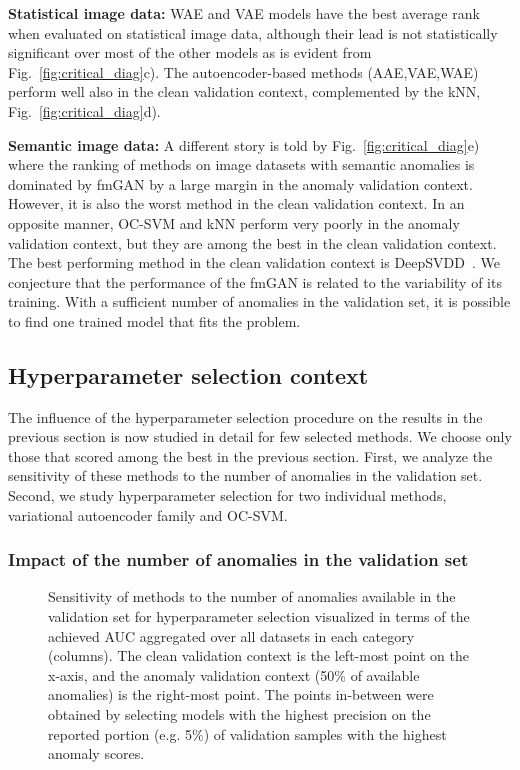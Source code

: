 \textbf{Statistical image data:} WAE and VAE models have the best average rank when evaluated on statistical image data, although their lead is not statistically significant over most of the other models as is evident from Fig.~\ref{fig:critical_diag}c). The autoencoder-based methods (AAE,VAE,WAE) perform well also in the clean validation context, complemented by the kNN, Fig.~\ref{fig:critical_diag}d).

\textbf{Semantic image data:} A different story is told by Fig.~\ref{fig:critical_diag}e) where the ranking of methods on image datasets with semantic anomalies is dominated by fmGAN by a large margin in the anomaly validation context. However, it is also the worst method in the clean validation context. In an opposite manner, OC-SVM and kNN perform very poorly in the anomaly validation context, but they are among the best in the clean validation context.  The best performing method in the clean validation context is DeepSVDD~\cite{ruff2018deep}. We conjecture that the performance of the fmGAN is related to the variability of its training. With a sufficient number of anomalies in the validation set, it is possible to find one trained model that fits the problem.

\subsection{Hyperparameter selection context}
\label{sec:hyperparameter_context}
The influence of the hyperparameter selection procedure on the results in the previous section is now studied in detail for few selected methods. We choose only those that scored among the best in the previous section. First, we analyze the sensitivity of these methods to the number of anomalies in the validation set. Second, we study hyperparameter selection for two individual methods, variational autoencoder family and OC-SVM.

\subsubsection{Impact of the number of anomalies in the validation set}
\begin{figure*}[hbt!]
    \centering
    \resizebox {\linewidth}{!}{
    
    }
    \caption{Sensitivity of methods to the number of anomalies available in the validation set for hyperparameter selection visualized in terms of the achieved AUC aggregated over all datasets in each category (columns). The clean validation context is the left-most point on the x-axis, and the anomaly validation context (50\% of available anomalies) is the right-most point. The points in-between were obtained by selecting models with the highest precision on the reported portion (e.g. 5\%) of validation samples with the highest anomaly scores.} 
    \label{fig:combined_knowledge_rank_patn_auc_repre}
\end{figure*}

